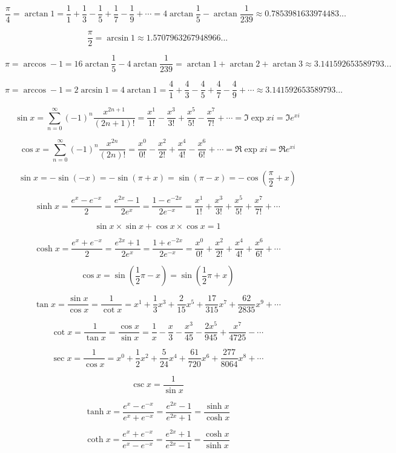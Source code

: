 \documentclass{article}
\begin{document}
$$\frac{\pi}{4} = \arctan1 =
\frac{1}{1} + \frac{1}{3} - \frac{1}{5} + \frac{1}{7} - \frac{1}{9} + \cdots =
4\arctan{\frac{1}{5}} - \arctan{\frac{1}{239}}\approx0.7853981633974483...$$

$$\frac{\pi}{2} = \arcsin1 \approx 1.5707963267948966...$$

$$\pi = \arccos-1 = 16\arctan{\frac{1}{5}} - 4\arctan{\frac{1}{239}} =
\arctan1 + \arctan2 + \arctan3\approx 3.141592653589793...$$

$$\pi = \arccos-1 = 2\arcsin1 = 4\arctan1 =
\frac{4}{1} + \frac{4}{3} - \frac{4}{5} + \frac{4}{7} - \frac{4}{9} + \cdots\approx
3.141592653589793...$$

$$\sin x = \sum_{n=0}^{\infty}(-1)^n\frac{x^{2n+1}}{(2n+1)!} =
\frac{x^1}{1!} - \frac{x^3}{3!} + \frac{x^5}{5!} - \frac{x^7}{7!} + \cdots =
\Im\exp xi = \Im e^{xi}$$

$$\cos x = \sum_{n=0}^{\infty}(-1)^n\frac{x^{2n}}{(2n)!} =
\frac{x^0}{0!} - \frac{x^2}{2!} + \frac{x^4}{4!} - \frac{x^6}{6!} + \cdots =
\Re\exp xi = \Re e^{xi}$$

$$\sin x = -\sin(-x) = -\sin(\pi + x) = \sin(\pi - x) = -\cos(\frac{\pi}{2} + x)$$

$$\sinh x = \frac{e^x - e^{-x}}{2} = \frac{e^{2x} - 1}{2e^x} = \frac{1 - e^{-2x}}{2e^{-x}} =
\frac{x^1}{1!} + \frac{x^3}{3!} + \frac{x^5}{5!} + \frac{x^7}{7!} + \cdots$$

$$\sin x\times\sin x + \cos x\times\cos x = 1$$

\[\cosh x = \frac{e^x + e^{-x}}{2} = \frac{e^{2x} + 1}{2e^x} = \frac{1 + e^{-2x}}{2e^{-x}} =
\frac{x^0}{0!} + \frac{x^2}{2!} + \frac{x^4}{4!} + \frac{x^6}{6!} + \cdots\]

$$\cos x = \sin(\frac{1}{2}\pi - x) = \sin(\frac{1}{2}\pi + x)$$

$$\tan x = \frac{\sin x}{\cos x} = \frac{1}{\cot x} =
x^1 + \frac{1}{3}x^3 + \frac{2}{15}x^5 +
\frac{17}{315}x^7 + \frac{62}{2835}x^9 + \cdots$$

$$\cot x = \frac{1}{\tan x} = \frac{\cos x}{\sin x} =
\frac{1}{x} - \frac{x}{3} - \frac{x^3}{45} - \frac{2x^5}{945} + \frac{x^7}{4725} - \cdots$$

$$\sec x = \frac{1}{\cos x} =
x^0 + \frac{1}{2}x^2 + \frac{5}{24}x^4 + \frac{61}{720}x^6 +
\frac{277}{8064}x^8 + \cdots$$

$$\csc x = \frac{1}{\sin x}$$

$$\tanh x = \frac{e^x-e^{-x}}{e^x+e^{-x}} =
\frac{e^{2x}-1}{e^{2x}+1} = \frac{\sinh x}{\cosh x}$$

$$\coth x = \frac{e^x + e^{-x}}{e^x - e^{-x}} =
\frac{e^{2x} + 1}{e^{2x} - 1} = \frac{\cosh x}{\sinh x}$$
\end{document}
